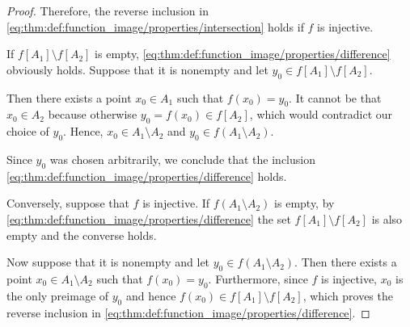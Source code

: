 \begin{proof}
  Therefore, the reverse inclusion in \eqref{eq:thm:def:function_image/properties/intersection} holds if \( f \) is injective.

   If \( f[A_1] \setminus f[A_2] \) is empty, \eqref{eq:thm:def:function_image/properties/difference} obviously holds. Suppose that it is nonempty and let \( y_0 \in f[A_1] \setminus f[A_2] \).

  Then there exists a point \( x_0 \in A_1 \) such that \( f(x_0) = y_0 \). It cannot be that \( x_0 \in A_2 \) because otherwise \( y_0 = f(x_0) \in f[A_2] \), which would contradict our choice of \( y_0 \). Hence, \( x_0 \in A_1 \setminus A_2 \) and \( y_0 \in f(A_1 \setminus A_2) \).

  Since \( y_0 \) was chosen arbitrarily, we conclude that the inclusion \eqref{eq:thm:def:function_image/properties/difference} holds.

  Conversely, suppose that \( f \) is injective. If \( f(A_1 \setminus A_2) \) is empty, by \eqref{eq:thm:def:function_image/properties/difference} the set \( f[A_1] \setminus f[A_2] \) is also empty and the converse holds.

  Now suppose that it is nonempty and let \( y_0 \in f(A_1 \setminus A_2) \). Then there exists a point \( x_0 \in A_1 \setminus A_2 \) such that \( f(x_0) = y_0 \). Furthermore, since \( f \) is injective, \( x_0 \) is the only preimage of \( y_0 \) and hence \( f(x_0) \in f[A_1] \setminus f[A_2] \), which proves the reverse inclusion in \eqref{eq:thm:def:function_image/properties/difference}.
\end{proof}


